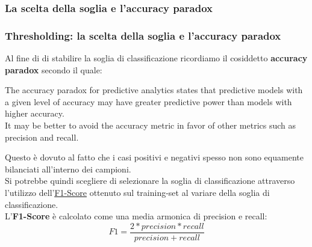 \subsubsection[La scelta della soglia e l'accuracy paradox]{La scelta della soglia e l'accuracy paradox}
\begin{frame}
	\frametitle{Thresholding: la scelta della soglia e l'accuracy paradox}
	
	Al fine di di stabilire la soglia di classificazione ricordiamo il cosiddetto \textbf{accuracy paradox} secondo il quale:
	
	\begin{scriptsize}
	\begin{tcolorbox}[colback=yellow!10,colframe=blue!40!black!60]
	  The accuracy paradox for predictive analytics states that predictive models with a given level of accuracy may have greater predictive power than models with higher accuracy.\\
	  It may be better to avoid the accuracy metric in favor of other metrics such as precision and recall.
	\end{tcolorbox}
	\end{scriptsize}
	
	Questo è dovuto al fatto che i casi positivi e negativi spesso non sono equamente bilanciati all'interno dei campioni.\\
	Si potrebbe quindi scegliere di selezionare la soglia di classificazione attraverso l'utilizzo dell'\underline{\href{https://en.wikipedia.org/wiki/F1_score}{F1-Score}} ottenuto sul training-set al variare della soglia di classificazione.\\
	L'\textbf{F1-Score} è calcolato come una media armonica di precision e recall:
	$$F1 = \frac{2 * precision * recall}{precision + recall}$$
	
\end{frame}



